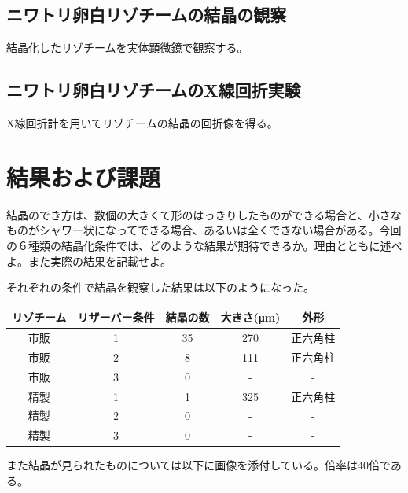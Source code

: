 \documentclass[a4paper,papersize,dvipdfmx]{jsarticle}
\begin{document}
\subsection*{ニワトリ卵白リゾチームの結晶の観察}
結晶化したリゾチームを実体顕微鏡で観察する。

\subsection*{ニワトリ卵白リゾチームのX線回折実験}
X線回折計を用いてリゾチームの結晶の回折像を得る。

\section*{結果および課題}

\begin{tcolorbox}[colback=white,colbacktitle=black,coltitle=white,title={1}]
結晶のでき方は、数個の大きくて形のはっきりしたものができる場合と、小さなものがシャワー状になってできる場合、あるいは全くできない場合がある。今回の６種類の結晶化条件では、どのような結果が期待できるか。理由とともに述べよ。また実際の結果を記載せよ。
\end{tcolorbox}

それぞれの条件で結晶を観察した結果は以下のようになった。

\begin{table}[H]
\begin{center}
\begin{tabular}{|c|c|c|c|c|}
\hline
リゾチーム & リザーバー条件 & 結晶の数 & 大きさ(μm) & 外形   \\ \hline
市販    & 1       & 35   & 270     & 正六角柱 \\ \hline
市販    & 2       & 8    & 111     & 正六角柱 \\ \hline
市販    & 3       & 0    & -       & -    \\ \hline
精製    & 1       & 1    & 325     & 正六角柱 \\ \hline
精製    & 2       & 0    & -       & -    \\ \hline
精製    & 3       & 0    & -       & -    \\ \hline
\end{tabular}
\end{center}
\end{table}

また結晶が見られたものについては以下に画像を添付している。倍率は40倍である。
\end{document}

